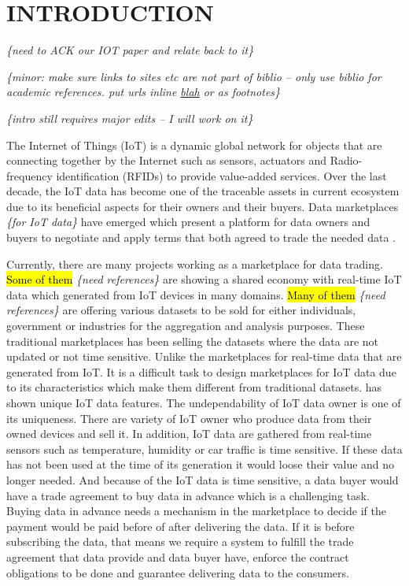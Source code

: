 \documentclass[letterpaper, 10 pt, conference]{ieeeconf}  %
\newcommand{\mynote}[1]{{\leavevmode\smaller\itshape\color{red}\{#1\}}}
\newcommand{\mycomment}[2]{\hl{#1} {{\leavevmode\smaller\color{red}\itshape\{#2\}}}}
\newcommand{\anote}[1]{{\leavevmode\smaller\itshape\color{red}\{#1\}}}
\begin{document}
\section{INTRODUCTION}


\mynote{need to ACK our IOT paper and relate back to it}


\anote{minor: make sure links to sites etc are not part of biblio -- only use biblio for academic references.  put urls inline \url{blah} or as footnotes}

\anote{intro still requires major edits -- I will work on it}

The Internet of Things (IoT) is a dynamic global network for objects that are connecting together by the Internet such as sensors, actuators and Radio-frequency identification (RFIDs) to provide value-added services. Over the last decade, the IoT data has become one of the traceable assets in current ecosystem due to its beneficial aspects for their owners and their buyers. Data marketplaces \anote{for IoT data} have emerged which present a platform for data owners and buyers to negotiate and apply terms that both agreed to trade the needed data \cite{misura}.

Currently, there are many projects working as a marketplace for data trading. \mycomment{Some of them}{need references} are showing a shared economy with real-time IoT data which generated from IoT devices in many domains. \mycomment{Many of them}{need references} are offering various datasets to be sold for either individuals, government or industries for the aggregation and analysis purposes. These traditional marketplaces has been selling the datasets where the data are not updated or not time sensitive. Unlike the marketplaces for real-time data that are generated from IoT. It is a difficult task to  design marketplaces for IoT data due to its characteristics which make them different from traditional datasets. \cite{misura} has shown unique IoT data features. The undependability of IoT data owner is one of its uniqueness. There are variety of IoT owner who produce data from their owned devices and sell it. In addition, IoT data are gathered from real-time sensors such as temperature, humidity or car traffic is time sensitive. If these data has not been used at the time of its generation it would loose their value and no longer needed. And because of the IoT data is time sensitive, a data buyer would have a trade agreement to buy data in advance which is a challenging task. Buying data in advance needs a mechanism in the marketplace to decide if the payment would be paid before of after delivering the data. If it is before subscribing the data, that means we require a system to fulfill the trade agreement that data provide and data buyer have, enforce the contract obligations to be done and guarantee delivering data to the consumers.
\end{document}
